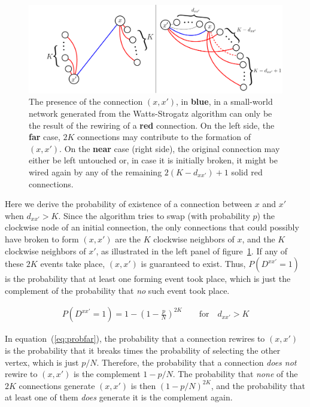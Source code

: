 \begin{figure}
  \centering
  \includegraphics[width=0.9\linewidth]{fig/rewire_contributions.png}
  \caption{The presence of the connection $(x,x')$, in {\color{blue}\textbf{blue}}, in a small-world network generated from the
    Watts-Strogatz algorithm can only be the result of the rewiring of a {\color{red}\textbf{red}} connection. On the left side, the
    \textbf{far} case, $2K$ connections may contribute to the formation of $(x,x')$. On the \textbf{near} case (right side), the
    original connection may either be left untouched or, in case it is initially broken, it might be wired again by any of the
  remaining $2(K-d_{xx'})+1$ solid {\color{red} red} connections.}
  \label{fig:rewire_contributions}
\end{figure}

Here we derive the probability of existence of a connection between $x$ and $x'$ when $d_{xx'}>K$. Since the algorithm tries to swap
(with probability $p$) the clockwise node of an initial connection, the only connections that could possibly have broken to form
$(x,x')$ are the $K$ clockwise neighbors of $x$, and the $K$ clockwise neighbors of $x'$, as illustrated in the left panel of
figure~\ref{fig:rewire_contributions}. If any of these $2K$ events take place, $(x,x')$ is guaranteed to exist. Thus, $P(D^{xx'}=1)$ is
the probability that at least one forming event took place, which is just the complement of the probability that \textit{no} such event
took place.

\begin{align}
  P(D^{xx'}=1) = 1 - \left( 1 - \frac{p}{N} \right)^{2K} \qquad \text{for} \quad d_{xx'} > K
  \label{eq:probfar}
\end{align}

In equation~(\ref{eq:probfar}), the probability that a connection rewires to $(x,x')$ is the probability that it breaks times the
probability of selecting the other vertex, which is just $p/N$. Therefore, the probability that a connection \textit{does not} rewire
to $(x,x')$ is the complement $1-p/N$. The probability that \textit{none} of the $2K$ connections generate $(x,x')$ is then
$(1-p/N)^{2K}$, and the probability that at least one of them \textit{does} generate it is the complement again.

